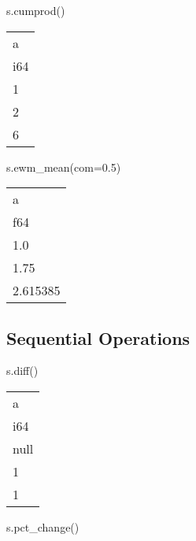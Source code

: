 \documentclass[
  letterpaper,
  DIV=11,
  numbers=noendperiod]{scrartcl}
\newenvironment{Shaded}{\begin{snugshade}}{\end{snugshade}}
\newcommand{\FloatTok}[1]{\textcolor[rgb]{0.68,0.00,0.00}{#1}}
\newcommand{\NormalTok}[1]{\textcolor[rgb]{0.00,0.23,0.31}{#1}}
\newcommand{\OperatorTok}[1]{\textcolor[rgb]{0.37,0.37,0.37}{#1}}
\begin{document}
\begin{Shaded}
\begin{Highlighting}[]
\NormalTok{s.cumprod()}
\end{Highlighting}
\end{Shaded}

\begin{longtable}[]{@{}l@{}}
\toprule()
a \\
i64 \\
\midrule()
\endhead
1 \\
2 \\
6 \\
\bottomrule()
\end{longtable}

\begin{Shaded}
\begin{Highlighting}[]
\NormalTok{s.ewm\_mean(com}\OperatorTok{=}\FloatTok{0.5}\NormalTok{)}
\end{Highlighting}
\end{Shaded}

\begin{longtable}[]{@{}l@{}}
\toprule()
a \\
f64 \\
\midrule()
\endhead
1.0 \\
1.75 \\
2.615385 \\
\bottomrule()
\end{longtable}

\hypertarget{sequential-operations}{%
\subsection{Sequential Operations}\label{sequential-operations}}

\begin{Shaded}
\begin{Highlighting}[]
\NormalTok{s.diff()}
\end{Highlighting}
\end{Shaded}

\begin{longtable}[]{@{}l@{}}
\toprule()
a \\
i64 \\
\midrule()
\endhead
null \\
1 \\
1 \\
\bottomrule()
\end{longtable}

\begin{Shaded}
\begin{Highlighting}[]
\NormalTok{s.pct\_change()}
\end{Highlighting}
\end{Shaded}
\end{document}
